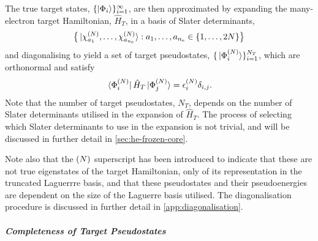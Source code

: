\documentclass[draft]{article}
\begin{document}
The true target states, $\lbrace\ket{\Phi_{i}}\rbrace_{i = 1}^{\infty}$, are then
approximated by expanding the many-electron target Hamiltonian, $\hat{H}_{T}$,
in a basis of Slater determinants,
\begin{equation}
  \label{eq:target-slater-determinant-basis}
  \lrset[\big]
  {
    \ket*
    {
      \chi_{a_{1}}^{\lr{N}},
      \dotsc,
      \chi_{a_{n_{\mathrm{e}}}}^{\lr{N}}
    }
    :
    a_{1}, \dotsc, a_{n_{\mathrm{e}}}
    \in
    \lrset{1, \dotsc, 2N}
  }
\end{equation}
and diagonalising to yield a set of target pseudostates,
$\lbrace\ket*{\Phi_{i}^{(N)}}\rbrace_{i = 1}^{N_{T}}$, which are orthonormal and
satisfy
\begin{equation}
  \label{eq:target-one-electron-states}
  \bra*{\Phi_{i}^{\lr{N}}}
  \hat{H}_{T}
  \ket*{\Phi_{j}^{\lr{N}}}
  =
  \epsilon_{i}^{\lr{N}}
  \delta_{i, j}
  .
\end{equation}
Note that the number of target pseudostates, $N_{T}$, depends on the number of
Slater determinants utilised in the expansion of $\hat{H}_{T}$.
The process of selecting which Slater determinants to use in the expansion is
not trivial, and will be discussed in further detail in
\autoref{sec:he-frozen-core}.

Note also that the $(N)$ superscript has been introduced to indicate that
these are not true eigenstates of the target Hamiltonian, only of its
representation in the truncated Laguerrre basis, and that these pseudostates and
their pseudoenergies are dependent on the size of the Laguerre basis utilised.
The diagonalisation procedure is discussed in further detail in
\autoref{app:diagonalisation}.

\subparagraph{Completeness of Target Pseudostates}
\label{sec:target-states-completeness}
\end{document}
